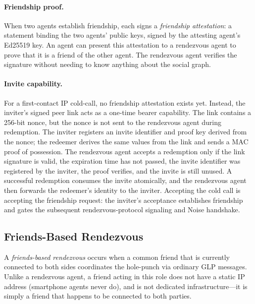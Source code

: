     
\paragraph{Friendship proof.}
\label{sec:friendship-proof}
When two agents establish friendship, each signs a \emph{friendship attestation}: a statement binding the two agents' public keys, signed by the attesting agent's Ed25519 key.  An agent can present this attestation to a rendezvous agent to prove that it is a friend of the other agent.  The rendezvous agent verifies the signature without needing to know anything about the social graph.

\paragraph{Invite capability.}
\label{sec:invite-capability}
For a first-contact IP cold-call, no friendship attestation exists yet.  Instead, the inviter's signed peer link acts as a one-time bearer capability.  The link contains a 256-bit nonce, but the nonce is not sent to the rendezvous agent during redemption.  The inviter registers an invite identifier and proof key derived from the nonce; the redeemer derives the same values from the link and sends a MAC proof of possession.  The rendezvous agent accepts a redemption only if the link signature is valid, the expiration time has not passed, the invite identifier was registered by the inviter, the proof verifies, and the invite is still unused.  A successful redemption consumes the invite atomically, and the rendezvous agent then forwards the redeemer's identity to the inviter.  Accepting the cold call is accepting the friendship request: the inviter's acceptance establishes friendship and gates the subsequent rendezvous-protocol signaling and Noise handshake.

\subsection{Friends-Based Rendezvous}
\label{sec:friends-based-rv}
A \emph{friends-based rendezvous} occurs when a common friend that is currently connected to both sides coordinates the hole-punch via ordinary GLP messages.  Unlike a rendezvous agent, a friend acting in this role does not have a static IP address (smartphone agents never do), and is not dedicated infrastructure---it is simply a friend that happens to be connected to both parties.

